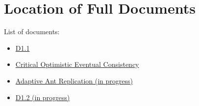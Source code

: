 \documentclass[12pt,twoside]{article}
\begin{document}
\section{Location of Full Documents}
List of documents:
\begin{itemize}
	\item \href{https://github.com/SyncFree/WP1/blob/master/D1_1/docs/WP1_D1.1_Use_Cases_in_Natural_Language.pdf}{D1.1}
	\item \href{https://github.com/SyncFree/WP1/blob/master/OCCSDoc/CriticalOptimisticEventualConsistency_0.1.pdf}{Critical Optimistic Eventual Consistency}
	\item \href{https://github.com/SyncFree/WP1/blob/master/AdaptiveReplication/docs/adaptiveAntReplication.pdf}{Adaptive Ant Replication (in progress)}
	\item \href{https://github.com/SyncFree/WP1/blob/master/D1.2/docs/D1_2.pdf}{D1.2 (in progress)}
\end{itemize}
%
\end{document}
